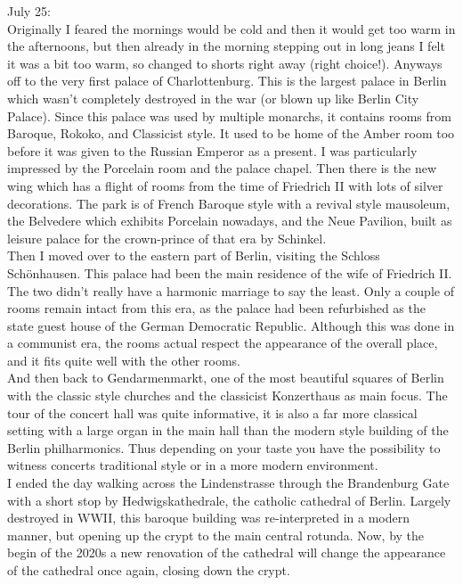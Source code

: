 July 25:\\
Originally I feared the mornings would be cold and then it would get too warm in the afternoons, but then already in the morning stepping out in long jeans I felt it was a bit too warm, so changed to shorts right away (right choice!). Anyways off to the very first palace of Charlottenburg. This is the largest palace in Berlin which wasn't completely destroyed in the war (or blown up like Berlin City Palace). Since this palace was used by multiple monarchs, it contains rooms from Baroque, Rokoko, and Classicist style. It used to be home of the Amber room too before it was given to the Russian Emperor as a present. I was particularly impressed by the Porcelain room and the palace chapel. Then there is the new wing which has a flight of rooms from the time of Friedrich II with lots of silver decorations. The park is of French Baroque style with a revival style mausoleum, the Belvedere which exhibits Porcelain nowadays, and the Neue Pavilion, built as leisure palace for the crown-prince of that era by Schinkel.\\
Then I moved over to the eastern part of Berlin, visiting the Schloss Sch\"onhausen. This palace had been the main residence of the wife of Friedrich II. The two didn't really have a harmonic marriage to say the least. Only a couple of rooms remain intact from this era, as the palace had been refurbished as the state guest house of the German Democratic Republic. Although this was done in a communist era, the rooms actual respect the appearance of the overall place, and it fits quite well with the other rooms.\\
And then back to Gendarmenmarkt, one of the most beautiful squares of Berlin with the classic style churches and the classicist Konzerthaus as main focus. The tour of the concert hall was quite informative, it is also a far more classical setting with a large organ in the main hall than the modern style building of the Berlin philharmonics. Thus depending on your taste you have the possibility to witness concerts traditional style or in a more modern environment. \\
I ended the day walking across the Lindenstrasse through the Brandenburg Gate with a short stop by Hedwigskathedrale, the catholic cathedral of Berlin. Largely destroyed in WWII, this baroque building was re-interpreted in a modern manner, but opening up the crypt to the main central rotunda. Now, by the begin of the 2020s a new renovation of the cathedral will change the appearance of the cathedral once again, closing down the crypt.\\


